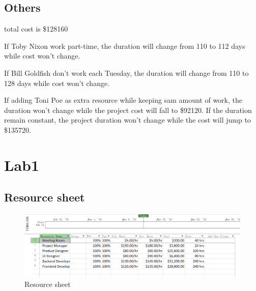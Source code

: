 \documentclass[runningheads]{llncs}
\begin{document}
\subsection{Others}

total cost is \$128160

\noindent
If Toby Nixon work part-time, the duration will change from 110 to 112 days while cost won't change.

\noindent
If Bill Goldfish don't work each Tuesday, the duration will change from 110 to 128 days while cost won't change.

\noindent
If adding Toni Poe as extra resource while keeping sam amount of work, the duration won't change while the project cost will fall to \$92120. If the duration remain constant, the project duration won't change while the cost will jump to \$135720.


\section{Lab1}
\subsection{Resource sheet}
\begin{figure}[H]
    \centering
    \includegraphics[width=1.0\textwidth]{./image/figure6}
    \caption{Resource sheet}
    \label{}
\end{figure}
\end{document}

